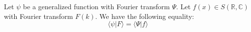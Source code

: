     \begin{property}
		Let $\psi$ be a generalized function with Fourier transform $\Psi$. Let $f(x)\in S(\mathbb{R},\mathbb{C})$ with Fourier transform $F(k)$. We have the following equality:
        \begin{equation}
			\langle \psi|F \rangle = \langle \Psi|f \rangle
		\end{equation}
	\end{property}
    

